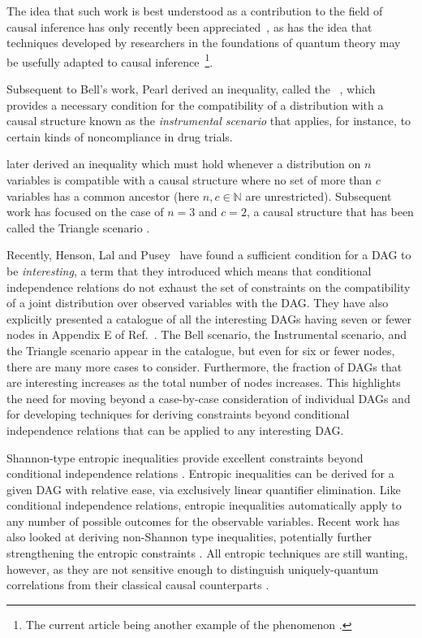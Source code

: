 The idea that such work is best understood as a contribution to the field of causal inference has only recently been appreciated~\cite{WoodSpekkens,fritz2012bell,pusey2014gdag,BeyondBellII}, as has the idea that techniques developed by researchers in the foundations of quantum theory may be usefully adapted to causal inference~\footnote{The current article being another example of the phenomenon \cite{ChavesNoSignalling,chaves2014informationinference,weilenmann2016entropic,kela2016covariance,ChavesPolynomial,TavakoliStarNetworks,RossetNetworks,TavakoliNoncyclicNetworks}.}.

Subsequent to Bell's work, Pearl derived an inequality, called the ~\cite{pearl1995instrumental}, which provides a necessary condition for the compatibility of a distribution with a causal structure 
known as the \emph{instrumental scenario} that applies, for instance, to certain kinds of noncompliance in drug trials.

\citet{steudel2010ancestors} later derived an inequality which must hold whenever a distribution on $n$
variables is compatible with a causal structure where no set of more
than $c$ variables has a common ancestor (here $n,c \in \mathbb{N}$ are unrestricted).  Subsequent work has focused on the case of $n=3$ and $c=2$, a causal structure that has been called the Triangle scenario \cite{fritz2012bell,chaves2014novel}.

Recently, Henson, Lal and Pusey~\cite{pusey2014gdag} have found a sufficient condition for a DAG to be {\em interesting}, a term that they introduced which means that conditional independence relations do not exhaust the set  of constraints on the compatibility of a joint distribution over observed variables with the DAG.  They have also explicitly presented a catalogue of all the interesting DAGs having seven or fewer nodes in Appendix E of Ref.~\cite{pusey2014gdag}.  The Bell scenario, the Instrumental scenario, and the Triangle scenario appear in the catalogue, but even for six or fewer nodes, there are many more cases to consider.   Furthermore, the fraction of DAGs that are interesting increases as the total number of nodes increases.  This highlights the need for moving beyond a case-by-case consideration of individual DAGs and for developing techniques for deriving constraints beyond conditional independence relations that can be applied to any interesting DAG.  

Shannon-type entropic inequalities provide excellent constraints beyond conditional independence relations \cite{fritz2013marginal,chaves2014novel,chaves2014informationinference}. Entropic inequalities can be derived for a given DAG with relative ease, via exclusively linear quantifier elimination. Like conditional independence relations, entropic inequalities automatically apply to any number of possible outcomes for the observable variables. Recent work has also looked at deriving non-Shannon type inequalities, potentially further strengthening the entropic constraints  \cite{weilenmann2016entropic,pianaar2016interesting}. All entropic techniques are still wanting, however, as they are not sensitive enough to distinguish uniquely-quantum correlations from their classical causal counterparts \cite{fritz2012bell,weilenmann2016entropic}.

